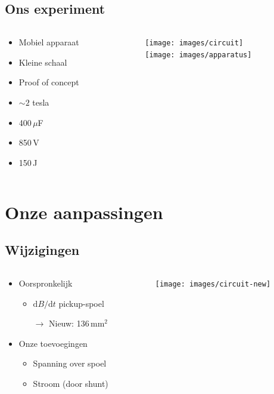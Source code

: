 \documentclass{beamer}
\newcommand{\derivs}[2]{\mathrm d #1 / \mathrm d #2}
\begin{document}
\subsection{Ons experiment}
\begin{frame}
\begin{columns}
\begin{column}{0.3\textwidth}
	\begin{itemize}
	\item Mobiel apparaat
	\item Kleine schaal
	\item Proof of concept
	\item $\sim2$ tesla
	\item 400\,$\mu$F
	\item 850\,V
	\item 150\,J
	\end{itemize}
\end{column}
\begin{column}{0.7\textwidth}
	\begin{center}
	\texttt{[image: images/circuit]} \\
	\texttt{[image: images/apparatus]}
	\end{center}
\end{column}
\end{columns}

\end{frame}

\section{Onze aanpassingen}
\subsection{Wijzigingen}
\begin{frame}
\begin{columns}
\begin{column}{0.5\textwidth}
	\begin{itemize}
	\item Oorspronkelijk
		\begin{itemize}
		\item $\derivs{B}{t}$ pickup-spoel
		\item[$\rightarrow$] Nieuw: 136\,mm$^2$
		\end{itemize}
	\item Onze toevoegingen
		\begin{itemize}
		\item Spanning over spoel
		\item Stroom (door shunt)
		\end{itemize}
	\end{itemize}
\end{column}
\begin{column}{0.5\textwidth}
	\begin{center}
	\texttt{[image: images/circuit-new]}
	\end{center}
\end{column}
\end{columns}
\end{frame}
\end{document}
